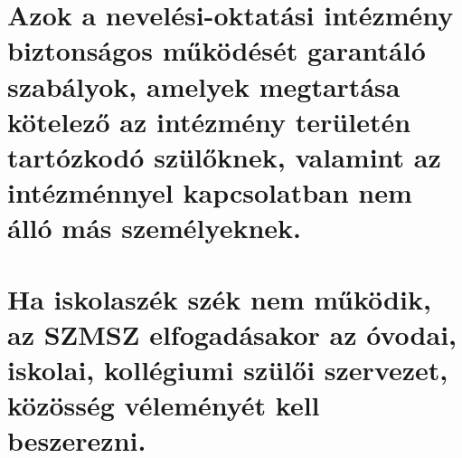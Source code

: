 \section{Azok a nevelési-oktatási intézmény biztonságos működését garantáló szabályok, amelyek megtartása kötelező az intézmény területén tartózkodó szülőknek, valamint az intézménnyel kapcsolatban nem álló más személyeknek.}
\section{Ha iskolaszék szék nem működik, az SZMSZ elfogadásakor az óvodai, iskolai, kollégiumi szülői szervezet, közösség véleményét kell beszerezni.}